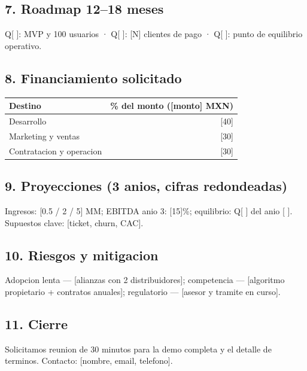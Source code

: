 \documentclass[11pt]{article}
\begin{document}
\subsection*{7. Roadmap 12–18 meses}
Q[ ]: MVP y 100 usuarios · Q[ ]: [N] clientes de pago · Q[ ]: punto de
equilibrio operativo.

\subsection*{8. Financiamiento solicitado}
\begin{center}
\begin{tabular}{lr}
  \toprule
  Destino & \% del monto ([monto] MXN) \\
  \midrule
  Desarrollo & [40] \\
  Marketing y ventas & [30] \\
  Contratacion y operacion & [30] \\
  \bottomrule
\end{tabular}
\end{center}

\subsection*{9. Proyecciones (3 anios, cifras redondeadas)}
Ingresos: [0.5 / 2 / 5] MM; EBITDA anio 3: [15]\%; equilibrio: Q[ ] del
anio [ ]. Supuestos clave: [ticket, churn, CAC].

\subsection*{10. Riesgos y mitigacion}
Adopcion lenta — [alianzas con 2 distribuidores]; competencia — [algoritmo
propietario + contratos anuales]; regulatorio — [asesor y tramite en curso].

\subsection*{11. Cierre}
Solicitamos reunion de 30 minutos para la demo completa y el detalle de
terminos. Contacto: [nombre, email, telefono].
\end{document}
